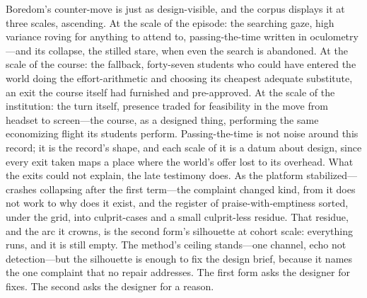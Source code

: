 \documentclass{article}
\begin{document}
Boredom's counter-move is just as design-visible, and the corpus displays it at three scales, ascending. At the scale of the episode: the searching gaze, high variance roving for anything to attend to, passing-the-time written in oculometry---and its collapse, the stilled stare, when even the search is abandoned. At the scale of the course: the fallback, forty-seven students who could have entered the world doing the effort-arithmetic and choosing its cheapest adequate substitute, an exit the course itself had furnished and pre-approved. At the scale of the institution: the turn itself, presence traded for feasibility in the move from headset to screen---the course, as a designed thing, performing the same economizing flight its students perform. Passing-the-time is not noise around this record; it is the record's shape, and each scale of it is a datum about design, since every exit taken maps a place where the world's offer lost to its overhead. What the exits could not explain, the late testimony does. As the platform stabilized---crashes collapsing after the first term---the complaint changed kind, from it does not work to why does it exist, and the register of praise-with-emptiness sorted, under the grid, into culprit-cases and a small culprit-less residue. That residue, and the arc it crowns, is the second form's silhouette at cohort scale: everything runs, and it is still empty. The method's ceiling stands---one channel, echo not detection---but the silhouette is enough to fix the design brief, because it names the one complaint that no repair addresses. The first form asks the designer for fixes. The second asks the designer for a reason.
\end{document}
